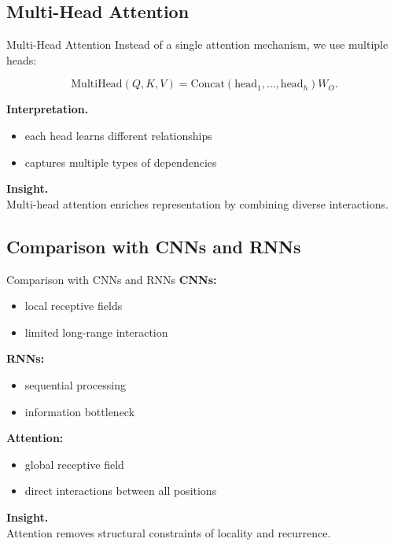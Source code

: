 \documentclass[aspectratio=169,11pt]{beamer}
\begin{document}
\subsection{Multi-Head Attention}
\begin{frame}[t,allowframebreaks]{Multi-Head Attention}
\small
Instead of a single attention mechanism, we use multiple heads:

\[
\text{MultiHead}(Q,K,V) =
\text{Concat}(\text{head}_1, \dots, \text{head}_h) W_O.
\]

\textbf{Interpretation.}\\ \begin{itemize}
    \item each head learns different relationships
    \item captures multiple types of dependencies
\end{itemize}

\textbf{Insight.}\\ Multi-head attention enriches representation by combining diverse interactions.
\end{frame}

\subsection{Comparison with CNNs and RNNs}
\begin{frame}[t,allowframebreaks]{Comparison with CNNs and RNNs}
\small
\textbf{CNNs:}\\ \begin{itemize}
    \item local receptive fields
    \item limited long-range interaction
\end{itemize}

\textbf{RNNs:}\\ \begin{itemize}
    \item sequential processing
    \item information bottleneck
\end{itemize}

\textbf{Attention:}\\ \begin{itemize}
    \item global receptive field
    \item direct interactions between all positions
\end{itemize}

\textbf{Insight.}\\ Attention removes structural constraints of locality and recurrence.
\end{frame}
\end{document}
